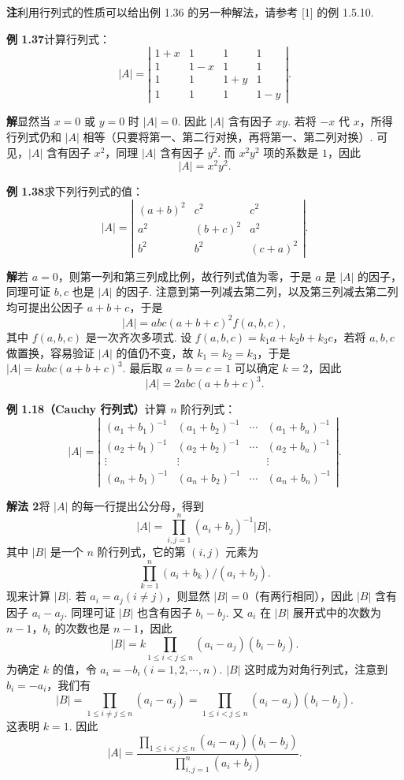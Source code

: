 \documentclass[UTF8,12pt,a4paper,fontset=fandol]{ctexart}
\begin{document}
\noindent\textbf{注}\quad 利用行列式的性质可以给出例 1.36 的另一种解法，请参考 [1] 的例 1.5.10.

\noindent\textbf{例 1.37}\quad 计算行列式：
\[
|A|=\left|\begin{array}{cccc}
1+x & 1 & 1 & 1\\
1 & 1-x & 1 & 1\\
1 & 1 & 1+y & 1\\
1 & 1 & 1 & 1-y
\end{array}\right|.
\]

\noindent\textbf{解}\quad 显然当 $x=0$ 或 $y=0$ 时 $|A|=0$. 因此 $|A|$ 含有因子 $xy$. 若将 $-x$ 代 $x$，所得行列式仍和 $|A|$ 相等（只要将第一、第二行对换，再将第一、第二列对换）. 可见，$|A|$ 含有因子 $x^2$，同理 $|A|$ 含有因子 $y^2$. 而 $x^2y^2$ 项的系数是 $1$，因此
\[
|A|=x^2y^2.
\]

\noindent\textbf{例 1.38}\quad 求下列行列式的值：
\[
|A|=\left|\begin{array}{ccc}
(a+b)^2 & c^2 & c^2\\
a^2 & (b+c)^2 & a^2\\
b^2 & b^2 & (c+a)^2
\end{array}\right|.
\]

\noindent\textbf{解}\quad 若 $a=0$，则第一列和第三列成比例，故行列式值为零，于是 $a$ 是 $|A|$ 的因子，同理可证 $b,c$ 也是 $|A|$ 的因子. 注意到第一列减去第二列，以及第三列减去第二列均可提出公因子 $a+b+c$，于是
\[
|A|=abc(a+b+c)^2f(a,b,c),
\]
其中 $f(a,b,c)$ 是一次齐次多项式. 设 $f(a,b,c)=k_1a+k_2b+k_3c$，若将 $a,b,c$ 做置换，容易验证 $|A|$ 的值仍不变，故 $k_1=k_2=k_3$，于是 $|A|=kabc(a+b+c)^3$. 最后取 $a=b=c=1$ 可以确定 $k=2$，因此
\[
|A|=2abc(a+b+c)^3.
\]

\noindent\textbf{例 1.18（Cauchy 行列式）}\quad 计算 $n$ 阶行列式：
\[
|A|=\left|\begin{array}{cccc}
(a_1+b_1)^{-1} & (a_1+b_2)^{-1} & \cdots & (a_1+b_n)^{-1}\\
(a_2+b_1)^{-1} & (a_2+b_2)^{-1} & \cdots & (a_2+b_n)^{-1}\\
\vdots & \vdots &        & \vdots\\
(a_n+b_1)^{-1} & (a_n+b_2)^{-1} & \cdots & (a_n+b_n)^{-1}
\end{array}\right|.
\]

\noindent\textbf{解法 2}\quad 将 $|A|$ 的每一行提出公分母，得到
\[
|A|=\prod_{i,j=1}^n(a_i+b_j)^{-1}|B|,
\]
其中 $|B|$ 是一个 $n$ 阶行列式，它的第 $(i,j)$ 元素为
\[
\prod_{k=1}^n(a_i+b_k)/(a_i+b_j).
\]
现来计算 $|B|$. 若 $a_i=a_j(i\ne j)$，则显然 $|B|=0$（有两行相同），因此 $|B|$ 含有因子 $a_i-a_j$. 同理可证 $|B|$ 也含有因子 $b_i-b_j$. 又 $a_i$ 在 $|B|$ 展开式中的次数为 $n-1$，$b_i$ 的次数也是 $n-1$，因此
\[
|B|=k\prod_{1\le i<j\le n}(a_i-a_j)(b_i-b_j).
\]
为确定 $k$ 的值，令 $a_i=-b_i(i=1,2,\cdots,n)$. $|B|$ 这时成为对角行列式，注意到 $b_i=-a_i$，我们有
\[
|B|=\prod_{1\le i\ne j\le n}(a_i-a_j)
=\prod_{1\le i<j\le n}(a_i-a_j)(b_i-b_j).
\]
这表明 $k=1$. 因此
\[
|A|=\frac{\prod_{1\le i<j\le n}(a_i-a_j)(b_i-b_j)}
{\prod_{i,j=1}^n(a_i+b_j)}.
\]
\end{document}
